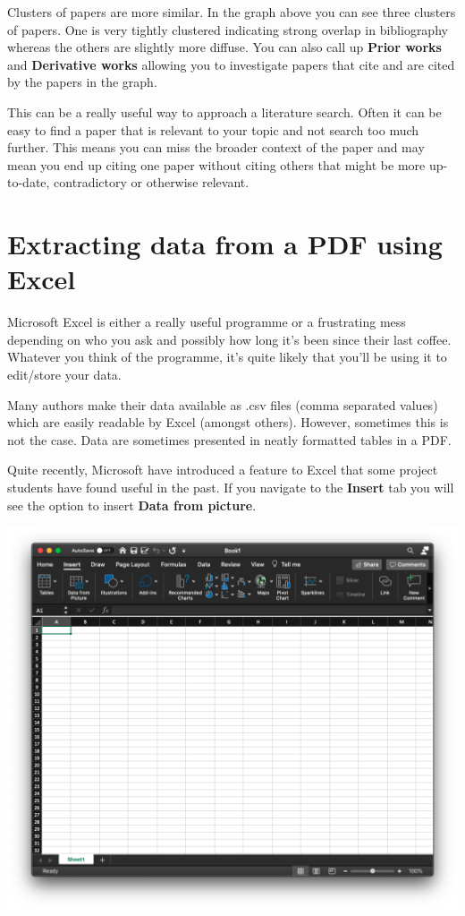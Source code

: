 \documentclass[
]{book}
\begin{document}
Clusters of papers are more similar. In the graph above you can see three clusters of papers. One is very tightly clustered indicating strong overlap in bibliography whereas the others are slightly more diffuse. You can also call up \textbf{Prior works} and \textbf{Derivative works} allowing you to investigate papers that cite and are cited by the papers in the graph.

This can be a really useful way to approach a literature search. Often it can be easy to find a paper that is relevant to your topic and not search too much further. This means you can miss the broader context of the paper and may mean you end up citing one paper without citing others that might be more up-to-date, contradictory or otherwise relevant.

\hypertarget{extracting-data-from-a-pdf-using-excel}{%
\section{Extracting data from a PDF using Excel}\label{extracting-data-from-a-pdf-using-excel}}

Microsoft Excel is either a really useful programme or a frustrating mess depending on who you ask and possibly how long it's been since their last coffee. Whatever you think of the programme, it's quite likely that you'll be using it to edit/store your data.

Many authors make their data available as .csv files (comma separated values) which are easily readable by Excel (amongst others). However, sometimes this is not the case. Data are sometimes presented in neatly formatted tables in a PDF.

Quite recently, Microsoft have introduced a feature to Excel that some project students have found useful in the past. If you navigate to the \textbf{Insert} tab you will see the option to insert \textbf{Data from picture}.

\begin{center}\includegraphics[width=14.14in]{Images/Screens/MSEx1} \end{center}
\end{document}
